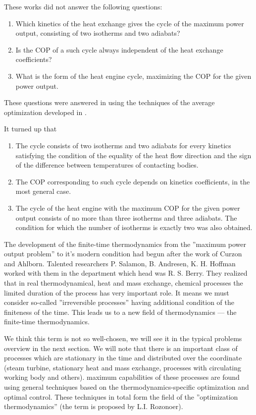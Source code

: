 \documentclass[epjST]{svjour}
\begin{document}
These works did not answer the following questions:
\begin{enumerate}
\item Which kinetics of the heat exchange gives the cycle of the maximum power output, consisting of two isotherms and two adiabats?
\item Is the COP of a such cycle always independent of the heat exchange coefficients?
\item What is the form of the heat engine cycle, maximizing the COP for the given power output.
\end{enumerate}

These questions were answered in \cite{RosTs}\cite{BeKaSi} using the techniques of the average optimization developed in \cite{Ts1}.
 
It turned up that
\begin{enumerate}
\item The cycle consists of two isotherms and two adiabats for every kinetics satisfying the condition of the equality of the heat flow direction and the sign of the difference between temperatures of contacting bodies.
\item The COP corresponding to such cycle depends on kinetics coefficients, in the most general case.
\item The cycle of the heat engine with the maximum COP for the given power output consists of no more than three isotherms and three adiabats. The condition for which the number of isotherms is exactly two was also obtained.
\end{enumerate}

The development of the finite-time thermodynamics from the ''maximum power output problem'' to it's modern condition had begun after the work of Curzon and Ahlborn\cite{CurAhl}. Talented researchers P. Salamon, B. Andresen, K. H. Hoffman worked with them in the department which head was R. S. Berry. They realized that in real thermodynamical, heat and mass exchange, chemical processes the limited duration of the process has very important role. It means we must consider so-called ''irreversible processes'' having additional condition of the finiteness of the time. This leads us to a new field of thermodynamics --- the finite-time thermodynamics\cite{SalHoSch}\cite{AndSalBe}\cite{AndSalBe2}\cite{And}.

We think this term is not so well-chosen, we will see it in the typical problems overview in the next section. We will note that there is an important class of processes which are stationary in the time and distributed over the coordinate (steam turbine, stationary heat and mass exchange, processes with circulating working body and others). maximum capabilities of these processes are found using general techniques based on the thermodynamics-specific optimization and optimal control. These techniques in total form the field of the ''optimization thermodynamics'' (the term is proposed by L.I. Rozonoer).
\end{document}

